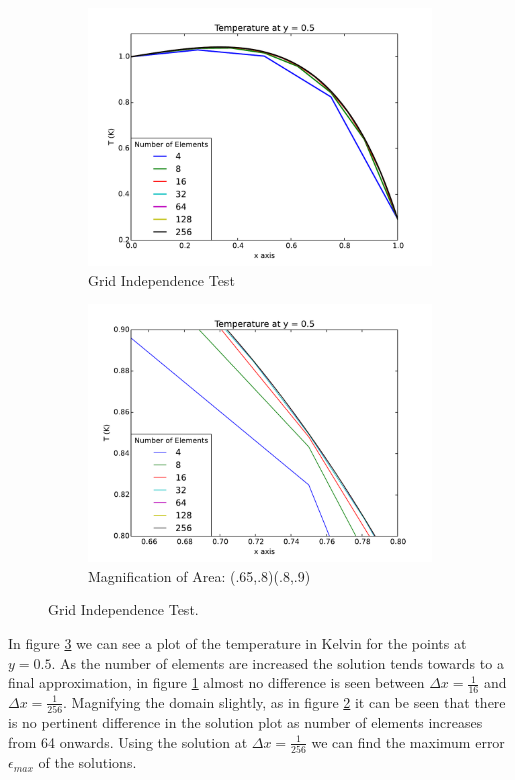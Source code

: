 \documentclass[10pt, a4paper]{article}
\begin{document}
\begin{figure}[!htb]
\centering
\begin{subfigure}{.5\textwidth}
  \centering
  \includegraphics[width=1\linewidth]{grid_ind}
  \caption{Grid Independence Test}
  \label{fig:grid_inda}
\end{subfigure}%
\begin{subfigure}{.5\textwidth}
  \centering
  \includegraphics[width=1\linewidth]{grid_zoom}
  \caption{Magnification of Area: (.65,.8)(.8,.9)}
  \label{fig:grid_indb}
\end{subfigure}
\caption{Grid Independence Test.}
\label{fig:grid_ind}
\end{figure}

In figure \ref{fig:grid_ind} we can see a plot of the temperature in Kelvin for the points at $y = 0.5$. As the number of elements are increased the solution tends towards to a final approximation, in figure \ref{fig:grid_inda} almost no difference is seen between $\Delta x = \frac{1}{16}$ and $\Delta x = \frac{1}{256}$. Magnifying the domain slightly, as in figure \ref{fig:grid_indb} it can be seen that there is no pertinent difference in the solution plot as number of elements increases from 64 onwards. Using the solution at $\Delta x = \frac{1}{256}$ we can find the maximum error $\epsilon_{max}$ of the solutions.
\end{document}

